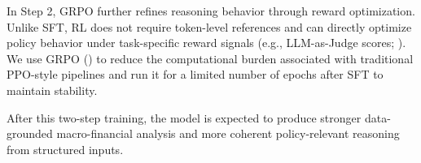 In Step 2, GRPO further refines reasoning behavior through reward optimization. Unlike SFT, RL does not require token-level references and can directly optimize policy behavior under task-specific reward signals (e.g., LLM-as-Judge scores; \cite{zheng2024judging}). We use GRPO (\cite{shao2024deepseekmath}) to reduce the computational burden associated with traditional PPO-style pipelines and run it for a limited number of epochs after SFT to maintain stability.


After this two-step training, the model is expected to produce stronger data-grounded macro-financial analysis and more coherent policy-relevant reasoning from structured inputs.


